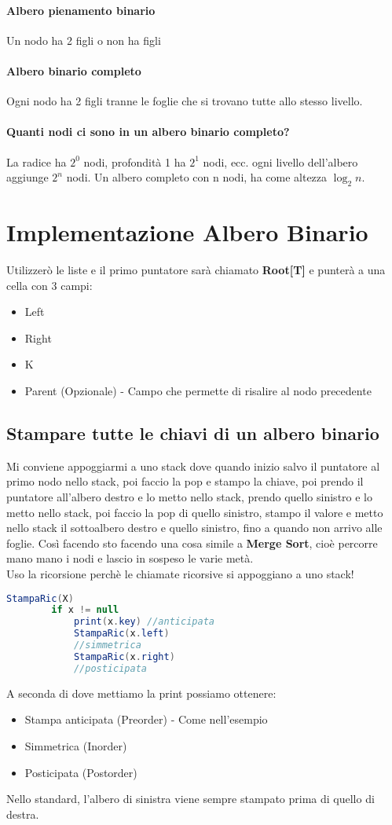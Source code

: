 \paragraph*{Albero pienamento binario} Un nodo ha 2 figli o non ha figli
\paragraph*{Albero binario completo} Ogni nodo ha 2 figli tranne le foglie che si trovano tutte
allo stesso livello.
\paragraph*{Quanti nodi ci sono in un albero binario completo?} La radice ha $2^0$ nodi, profondità
1 ha $2^1$ nodi, ecc. ogni livello dell'albero aggiunge $2^n$ nodi. Un albero completo con n nodi, 
ha come altezza $\log_2 n$.
\section{Implementazione Albero Binario}
Utilizzerò le liste e il primo puntatore sarà chiamato \textbf{Root[T]} e punterà a una cella
con 3 campi:
\begin{itemize}
    \item Left
    \item Right
    \item K
    \item Parent (Opzionale) - Campo che permette di risalire al nodo precedente
\end{itemize}
\subsection{Stampare tutte le chiavi di un albero binario}
Mi conviene appoggiarmi a uno stack dove quando inizio salvo il puntatore al primo nodo
nello stack, poi faccio la pop e stampo la chiave, poi prendo il puntatore all'albero destro
e lo metto nello stack, prendo quello sinistro e lo metto nello stack, poi faccio la pop
di quello sinistro, stampo il valore e metto nello stack il sottoalbero destro e quello sinistro,
fino a quando non arrivo alle foglie. Così facendo sto facendo una cosa simile a \textbf{Merge Sort},
cioè percorre mano mano i nodi e lascio in sospeso le varie metà.\\
Uso la ricorsione perchè le chiamate ricorsive si appoggiano a uno stack!
\begin{lstlisting}[language=Java]
    StampaRic(X)
        if x != null
            print(x.key) //anticipata
            StampaRic(x.left)
            //simmetrica
            StampaRic(x.right)
            //posticipata
\end{lstlisting}
A seconda di dove mettiamo la print possiamo ottenere:
\begin{itemize}
    \item Stampa anticipata (Preorder) - Come nell'esempio
    \item Simmetrica (Inorder)
    \item Posticipata (Postorder)
\end{itemize}
Nello standard, l'albero di sinistra viene sempre stampato prima di quello di destra.

